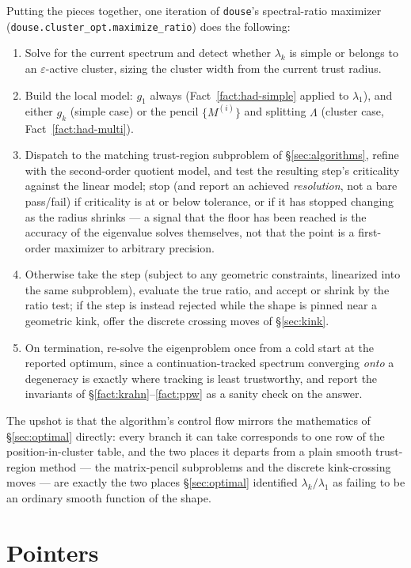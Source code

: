 \documentclass[11pt]{article}
\newcommand{\code}[1]{\texttt{#1}}
\theoremstyle{plain}
\begin{document}
Putting the pieces together, one iteration of \code{douse}'s spectral-ratio maximizer
(\code{douse.cluster\_opt.maximize\_ratio}) does the following:
\begin{enumerate}
\item Solve for the current spectrum and detect whether $\lambda_k$ is simple or belongs to an
  $\varepsilon$-active cluster, sizing the cluster width from the current trust radius.
\item Build the local model: $g_1$ always (Fact~\ref{fact:had-simple} applied to $\lambda_1$), and
  either $g_k$ (simple case) or the pencil $\{M^{(i)}\}$ and splitting $\Lambda$ (cluster case,
  Fact~\ref{fact:had-multi}).
\item Dispatch to the matching trust-region subproblem of \S\ref{sec:algorithms}, refine with the
  second-order quotient model, and test the resulting step's criticality against the linear model;
  stop (and report an achieved \emph{resolution}, not a bare pass/fail) if criticality is at or
  below tolerance, or if it has stopped changing as the radius shrinks --- a signal that the floor
  has been reached is the accuracy of the eigenvalue solves themselves, not that the point is a
  first-order maximizer to arbitrary precision.
\item Otherwise take the step (subject to any geometric constraints, linearized into the same
  subproblem), evaluate the true ratio, and accept or shrink by the ratio test; if the step is
  instead rejected while the shape is pinned near a geometric kink, offer the discrete crossing
  moves of \S\ref{sec:kink}.
\item On termination, re-solve the eigenproblem once from a cold start at the reported optimum,
  since a continuation-tracked spectrum converging \emph{onto} a degeneracy is exactly where
  tracking is least trustworthy, and report the invariants of \S\ref{fact:krahn}--\ref{fact:ppw}
  as a sanity check on the answer.
\end{enumerate}

The upshot is that the algorithm's control flow mirrors the mathematics of
\S\ref{sec:optimal} directly: every branch it can take corresponds to one row of the
position-in-cluster table, and the two places it departs from a plain smooth trust-region method
--- the matrix-pencil subproblems and the discrete kink-crossing moves --- are exactly the two
places \S\ref{sec:optimal} identified $\lambda_k/\lambda_1$ as failing to be an ordinary smooth
function of the shape.

\section*{Pointers}
\end{document}
